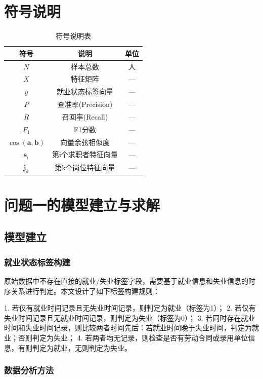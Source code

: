 \documentclass[withoutpreface,bwprint]{cumcmthesis}
\begin{document}
\section{符号说明}
\begin{table}[H]
\centering
\caption{符号说明表}
\begin{tabularx}{\textwidth}{CCC}
\toprule
符号    & 说明    & 单位 \\
\midrule
$N$ & 样本总数 & 人 \\
$X$ & 特征矩阵 & — \\
$y$ & 就业状态标签向量 & — \\
$P$ & 查准率(Precision) & — \\
$R$ & 召回率(Recall) & — \\
$F_1$ & F1分数 & — \\
$\cos(\mathbf{a},\mathbf{b})$ & 向量余弦相似度 & — \\
$\mathbf{s}_i$ & 第i个求职者特征向量 & — \\
$\mathbf{j}_k$ & 第k个岗位特征向量 & — \\
\bottomrule
\end{tabularx}
\label{tab:符号说明}
\end{table}

\section{问题一的模型建立与求解}
\subsection{模型建立}

\subsubsection{就业状态标签构建}

原始数据中不存在直接的就业/失业标签字段，需要基于就业信息和失业信息的时序关系进行判定。本文设计了如下标签构建规则：

1. 若仅有就业时间记录且无失业时间记录，则判定为就业（标签为1）；
2. 若仅有失业时间记录且无就业时间记录，则判定为失业（标签为0）；
3. 若同时存在就业时间和失业时间记录，则比较两者时间先后：若就业时间晚于失业时间，判定为就业；否则判定为失业；
4. 若两者均无记录，则检查是否有劳动合同或录用单位信息，有则判定为就业，无则判定为失业。

\subsubsection{数据分析方法}
\end{document}
